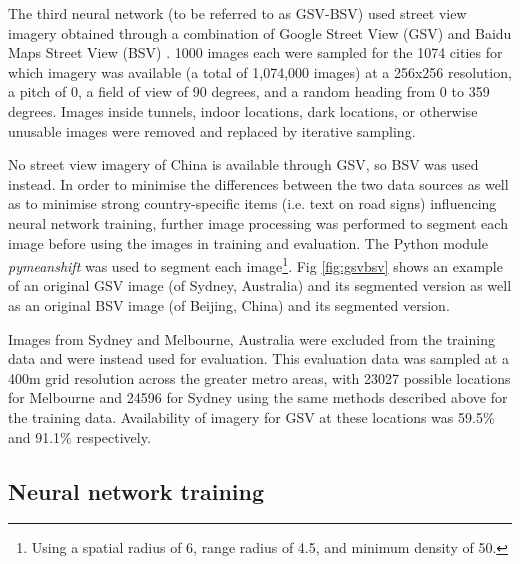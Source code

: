 \documentclass[10pt,letterpaper,hidelinks]{article}
\begin{document}
The third neural network (to be referred to as GSV-BSV) used street view imagery obtained through a combination of Google Street View (GSV) \cite{GoogleMaps2017b} and Baidu Maps Street View (BSV) \cite{Baidu2017}. 1000 images each were sampled for the 1074 cities for which imagery was available (a total of 1,074,000 images) at a 256x256 resolution, a pitch of 0, a field of view of 90 degrees, and a random heading from 0 to 359 degrees. Images inside tunnels, indoor locations, dark locations, or otherwise unusable images were removed and replaced by iterative sampling.

No street view imagery of China is available through GSV, so BSV was used instead.  In order to minimise the differences between the two data sources as well as to minimise strong country-specific items (i.e. text on road signs) influencing neural network training, further image processing was performed to segment each image before using the images in training and evaluation. The Python module \textit{pymeanshift} \cite{Pymeanshift2017} was used to segment each image\footnote{Using a spatial radius of 6, range radius of 4.5, and minimum density of 50.}. Fig \ref{fig:gsvbsv} shows an example of an original GSV image (of Sydney, Australia) and its segmented version as well as an original BSV image (of Beijing, China) and its segmented version.




Images from Sydney and Melbourne, Australia were excluded from the training data and were instead used for evaluation. This evaluation data was sampled at a 400m grid resolution across the greater metro areas, with 23027 possible locations for Melbourne and 24596 for Sydney using the same methods described above for the training data. Availability of imagery for GSV at these locations was 59.5\% and 91.1\% respectively. 


 \subsection*{Neural network training}\label{sec:methods4}    
\end{document}
